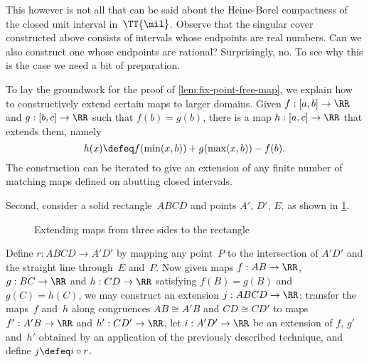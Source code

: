 This however is not all that can be said about the Heine-Borel compactness of the closed unit interval in~$\TT{\mil}$.
%
Observe that the singular cover constructed above consists of intervals whose endpoints are real numbers.
%
Can we also construct one whose endpoints are rational? Surprisingly, no.
%
To see why this is the case we need a bit of preparation.

To lay the groundwork for the proof of \cref{lem:fix-point-free-map}, we explain how to constructively extend certain maps to larger domains.
%
Given $f : [a,b] \to \RR$ and $g : [b, c] \to \RR$ such that $f(b) = g(b)$, there is a map $h : [a,c] \to \RR$ that extends them, namely
%
\begin{equation*}
  h(x) \defeq f(\min(x, b)) + g(\max(x, b)) - f(b).
\end{equation*}
%
The construction can be iterated to give an extension of any finite number of matching maps defined on abutting closed intervals.

Second, consider a solid rectangle~$ABCD$ and points $A'$, $D'$, $E$, as shown in \cref{fig:rectangle}.
%
\begin{figure}[ht]
  \centering
  \caption{Extending maps from three sides to the rectangle}
  \label{fig:rectangle}
\end{figure}
%
Define $r : ABCD \to A'D'$ by mapping any point~$P$ to the intersection of $A'D'$ and the straight line through~$E$ and~$P$.
%
Now given maps $f : AB \to \RR$, $g : BC \to \RR$ and $h : CD \to \RR$ satisfying $f(B) = g(B)$ and $g(C) = h(C)$,
we may construct an extension $j : ABCD \to \RR$: transfer the maps~$f$ and~$h$ along congruences $AB \cong A'B$ and $CD \cong CD'$ to maps $f' : A'B \to \RR$ and $h' : CD' \to \RR$, let $i : A'D' \to \RR$ be an extension of $f$, $g'$ and~$h'$ obtained by an application of the previously described technique, and define $j \defeq i \circ r$.

